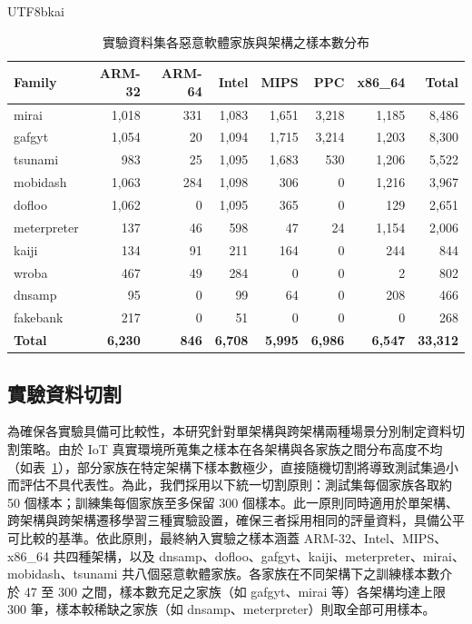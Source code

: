 \documentclass[10pt, a4paper, twocolumn]{article}
\begin{document}
\begin{CJK*}{UTF8}{bkai}
\begin{table}[t]
\centering
\caption{實驗資料集各惡意軟體家族與架構之樣本數分布}
\label{tab:dataset}
\fontsize{8.5pt}{11pt}\selectfont
\begin{tabular}{lrrrrrrr}
\toprule
\textbf{Family} & \textbf{ARM-32} & \textbf{ARM-64} & \textbf{Intel} & \textbf{MIPS} & \textbf{PPC} & \textbf{x86\_64} & \textbf{Total} \\
\midrule
mirai       & 1,018 & 331 & 1,083 & 1,651 & 3,218 & 1,185 & 8,486 \\
gafgyt      & 1,054 &  20 & 1,094 & 1,715 & 3,214 & 1,203 & 8,300 \\
tsunami     &   983 &  25 & 1,095 & 1,683 &   530 & 1,206 & 5,522 \\
mobidash    & 1,063 & 284 & 1,098 &   306 &     0 & 1,216 & 3,967 \\
dofloo      & 1,062 &   0 & 1,095 &   365 &     0 &   129 & 2,651 \\
meterpreter &   137 &  46 &   598 &    47 &    24 & 1,154 & 2,006 \\
kaiji       &   134 &  91 &   211 &   164 &     0 &   244 &   844 \\
wroba       &   467 &  49 &   284 &     0 &     0 &     2 &   802 \\
dnsamp      &    95 &   0 &    99 &    64 &     0 &   208 &   466 \\
fakebank    &   217 &   0 &    51 &     0 &     0 &     0 &   268 \\
\midrule
\textbf{Total} & \textbf{6,230} & \textbf{846} & \textbf{6,708} & \textbf{5,995} & \textbf{6,986} & \textbf{6,547} & \textbf{33,312} \\
\bottomrule
\end{tabular}
\end{table}

\subsection{實驗資料切割}

為確保各實驗具備可比較性，本研究針對單架構與跨架構兩種場景分別制定資料切割策略。由於 IoT 真實環境所蒐集之樣本在各架構與各家族之間分布高度不均（如表~\ref{tab:dataset}），部分家族在特定架構下樣本數極少，直接隨機切割將導致測試集過小而評估不具代表性。為此，我們採用以下統一切割原則：測試集每個家族各取約 50 個樣本；訓練集每個家族至多保留 300 個樣本。此一原則同時適用於單架構、跨架構與跨架構遷移學習三種實驗設置，確保三者採用相同的評量資料，具備公平可比較的基準。依此原則，最終納入實驗之樣本涵蓋 ARM-32、Intel、MIPS、x86\_64 共四種架構，以及 dnsamp、dofloo、gafgyt、kaiji、\allowbreak meterpreter、mirai、mobidash、tsunami 共八個惡意軟體家族。各家族在不同架構下之訓練樣本數介於 47 至 300 之間，樣本數充足之家族（如 gafgyt、mirai 等）各架構均達上限 300 筆，樣本較稀缺之家族（如 dnsamp、meterpreter）則取全部可用樣本。


\end{CJK*}
\end{document}
